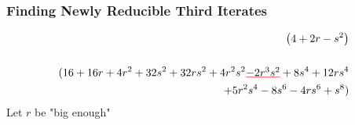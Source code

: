 \begin{frame}
	\frametitle{Finding Newly Reducible Third Iterates}
	\begin{align*}
		\begin{split}
		\left(4 + 2 r - s^2\right) \\
		\phantom{x} \\
		(16 + 16 r + 4 r^2 + 32 s^2 + 32 r s^2 + 4 r^2 s^2 \hunder{$- 2 r^3 s^2$} + 8 s^4 + 12 r s^4 \\ + 5 r^2 s^4 - 8 s^6 - 4 r s^6 + s^8)
		\end{split}
	\end{align*}
	\pause
	Let $r$ be "big enough"
\end{frame}






















